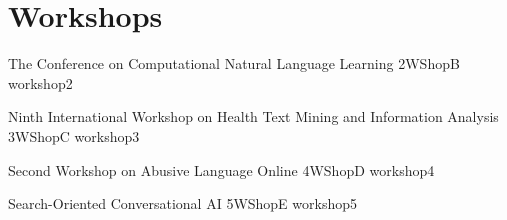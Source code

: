 \chapter[Workshops: \daydate]{Workshops}
\thispagestyle{emptyheader}
\vfill




\clearpage
{}

%      
      

      \begin{wsschedule}
      {The Conference on Computational Natural Language Learning}
      {2}{WShopB}
      {workshop2}
      {\WShopLocB}
      
      \end{wsschedule}
       


 \begin{wsschedule}
      {Ninth International Workshop on Health Text Mining and Information Analysis}
      {3}{WShopC}
      {workshop3}
      {\WShopLocC}
      
      \end{wsschedule}
      

      \begin{wsschedule}
      {Second Workshop on Abusive Language Online}
      {4}{WShopD}
      {workshop4}
      {\WShopLocD}
      
      \end{wsschedule}
      

      \begin{wsschedule}
      {Search-Oriented Conversational AI}
      {5}{WShopE}
      {workshop5}
      {\WShopLocE}
      
      \end{wsschedule}
      

